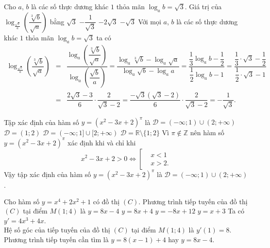 \begin{ex}%
	Cho $a$, $b$ là các số thực dương khác $1$ thỏa mãn $\log_a b=\sqrt{3}$. Giá trị của $\log_{\frac{\sqrt{b}}{a}}\left(\dfrac{\sqrt[3]{b}}{\sqrt{a}}\right)$ bằng
	\choice
	{$\sqrt{3}$}
	{\True $-\dfrac{1}{\sqrt{3}}$}
	{$-2\sqrt{3}$}
	{$-\sqrt{3}$}
	\loigiai
	{
		Với mọi $a$, $b$ là các số thực dương khác $1$ thỏa mãn $\log_a b=\sqrt{3}$ ta có
		\allowdisplaybreaks
		\begin{eqnarray*}
			\log_{\frac{\sqrt{b}}{a}}\left(\dfrac{\sqrt[3]{b}}{\sqrt{a}}\right) &=& \dfrac{\log_a \left(\dfrac{\sqrt[3]{b}}{\sqrt{a}}\right)}{\log_a\left(\dfrac{\sqrt{b}}{a}\right)} = \dfrac{\log_a \sqrt[3]{b} - \log_a \sqrt{a}}{\log_a \sqrt{b} - \log_a a} = \dfrac{\dfrac{1}{3}\log_a b - \dfrac{1}{2}}{\dfrac{1}{2}\log_a b-1} = \dfrac{\dfrac{1}{3}\cdot \sqrt{3}-\dfrac{1}{2}}{\dfrac{1}{2}\cdot \sqrt{3}-1}\\
			&=& \dfrac{2\sqrt{3}-3}{6}\cdot \dfrac{2}{\sqrt{3}-2} = \dfrac{-\sqrt{3}\left(\sqrt{3}-2\right)}{6}\cdot \dfrac{2}{\sqrt{3}-2} = -\dfrac{1}{\sqrt{3}}.
		\end{eqnarray*}
	}
\end{ex}

\begin{ex}%
	Tập xác định của hàm số $y=\left(x^2-3x+2\right)^{\pi}$ là
	\choice
	{\True $\mathscr{D}=(-\infty;1)\cup (2;+\infty)$}
	{$\mathscr{D}=(1;2)$}
	{$\mathscr{D}=(-\infty;1]\cup [2;+\infty)$}
	{$\mathscr{D}=\mathbb{R}\setminus \{1;2\}$}
	\loigiai
	{
		Vì $\pi \notin \mathbb{Z}$ nên hàm số $y=\left(x^2-3x+2\right)^{\pi}$ xác định khi và chỉ khi
		\[x^2-3x+2>0 \Leftrightarrow \left[\begin{aligned}&x<1 \\&x>2.\end{aligned}\right.\]
		Vậy tập xác định của hàm số $y=\left(x^2-3x+2\right)^{\pi}$ là $\mathscr{D}=(-\infty;1)\cup (2;+\infty)$.
	}
\end{ex}

\begin{ex}%
	Cho hàm số $y=x^4+2x^2+1$ có đồ thị $(C)$. Phương trình tiếp tuyến của đồ thị $(C)$ tại điểm $M(1;4)$ là
	\choice
	{\True $y=8x-4$}
	{$y=8x+4$}
	{$y=-8x+12$}
	{$y=x+3$}
	\loigiai
	{
		Ta có $y'=4x^3+4x$.\\
		Hệ số góc của tiếp tuyến của đồ thị $(C)$ tại điểm $M(1;4)$ là $y'(1)=8$.\\
		Phương trình tiếp tuyến cần tìm là $y=8(x-1)+4$ hay $y=8x-4$.
	}
\end{ex}

